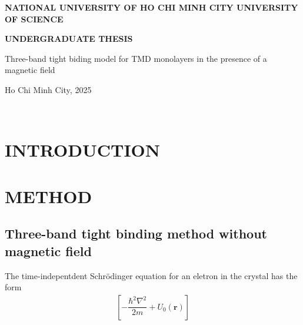 \documentclass{report}
\newcommand{\f}[2]{\dfrac{#1}{#2}}
\newcommand{\thesistitlee}{Three-band tight biding model for TMD monolayers in the presence of a magnetic field}
\newcommand{\address}{NATIONAL UNIVERSITY OF HO CHI MINH CITY UNIVERSITY OF SCIENCE}
\newcommand{\graddate}{Ho Chi Minh City, 2025}
\begin{document}
\setlength{\parindent}{20pt}
\begin{center}
	{\bfseries

		{\large {\bf \address}}\\
		\vspace{2.5cm}

		{\large {\bf UNDERGRADUATE THESIS}}\\
		\vspace{3.0cm}


		{\largerrr\thesistitlee}
		\vspace{1in}

		{\large\graddate}
	}

\end{center}
\noindent
\makebox[\textwidth]{\hfill\makebox[3in]{\hrulefill}}\\
\begin{center}
\end{center}
\newpage
\pagestyle{fancy}
\renewcommand{\headrulewidth}{0pt}
\fancyhf{}
\fancyfoot[C]{\hspace{0cm} \thepage}
\setcounter{page}{1}
\renewcommand{\contentsname}{TABLE OF CONTENTS}
\tableofcontents
\renewcommand{\listfigurename}{LIST OF FIGURES}
\listoffigures
\chapter{\textbf{INTRODUCTION}}
\chapter{\textbf{METHOD}}
\section{Three-band tight binding method without magnetic field}
The time-indepentdent Schr\"{o}dinger equation for an eletron in the crystal has the form
\begin{gather}
	\left[-\f{\hbar^{2} \nabla^{2}}{2m} + U_{0}(\mathbf{r})\right]
\end{gather}
\end{document}
